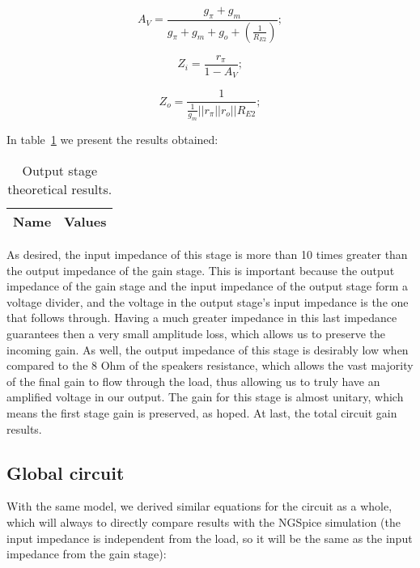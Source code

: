 \begin{equation}
  A_V = \frac{g_\pi+g_m}{g_\pi+g_m+g_o+(\frac{1}{R_{E2}})};
\end{equation}

\begin{equation}
  Z_i=\frac{r_\pi}{1-A_V};
\end{equation}

\begin{equation}
  Z_o=\frac{1}{\frac{1}{g_m}||r_\pi||r_o||R_{E2}};
\end{equation}

In table~\ref{tab:output} we present the results obtained:

\begin{table}[h]
  \centering
  \begin{tabular}{|l|r|}
    \hline    
    {\bf Name} & {\bf Values} \\ \hline
     
  \end{tabular}
  \caption{Output stage theoretical results.}
  \label{tab:output}
\end{table}
\pagebreak

As desired, the input impedance of this stage is more than 10 times greater than the output impedance of the gain stage. This is important because the output impedance of the gain stage and the input impedance of the output stage form a voltage divider, and the voltage in the output stage's input impedance is the one that follows through. Having a much greater impedance in this last impedance guarantees then a very small amplitude loss, which allows us to preserve the incoming gain. As well, the output impedance of this stage is desirably low when compared to the 8 Ohm of the speakers resistance, which allows the vast majority of the final gain to flow through the load, thus allowing us to truly have an amplified voltage in our output. The gain for this stage is almost unitary, which means the first stage gain is preserved, as hoped.
At last, the total circuit gain results.

\subsection{Global circuit}
With the same model, we derived similar equations for the circuit as a whole, which will always to directly compare results with the NGSpice simulation (the input impedance is independent from the load, so it will be the same as the input impedance from the gain stage):

